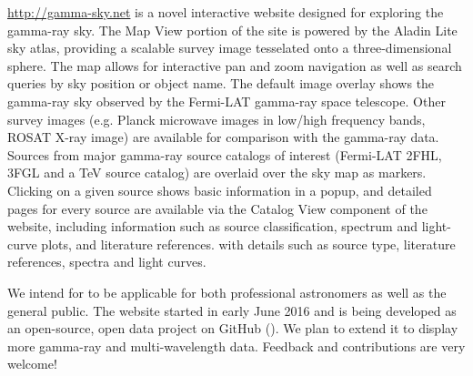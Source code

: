 \url{http://gamma-sky.net} is a novel interactive website designed for exploring the gamma-ray sky. The Map View portion of the site is powered by the Aladin Lite sky atlas, providing a scalable survey image tesselated onto a three-dimensional sphere. The map allows for interactive pan and zoom navigation as well as search queries by sky position or object name. The default image overlay shows the gamma-ray sky observed by the Fermi-LAT gamma-ray space telescope. Other survey images (e.g. Planck microwave images in low/high frequency bands, ROSAT X-ray image) are available for comparison with the gamma-ray data.
Sources from major gamma-ray source catalogs of interest (Fermi-LAT 2FHL, 3FGL and a TeV source catalog) are overlaid over the sky map as markers. Clicking on a given source shows basic information in a popup, and detailed pages for every source are available via the Catalog View component of the website, including information such as source classification, spectrum and light-curve plots, and literature references. with details such as source type, literature references, spectra and light curves.

We intend for \gammasky to be applicable for both professional astronomers as well as the general public. The website started in early June 2016 and is being developed as an open-source, open data project on GitHub (\gammaskygh). We plan to extend it to display more gamma-ray and multi-wavelength data. Feedback and contributions are very welcome!
